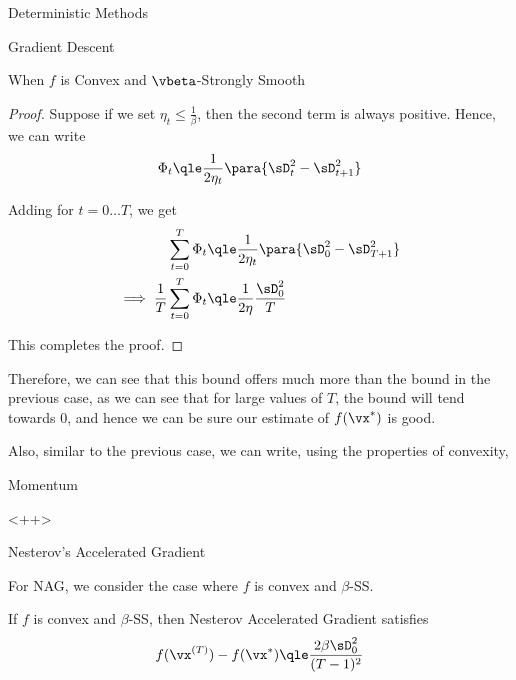 \documentclass{article}
\newcommand{\x}[1]{\vx^{(#1)}}
\newcommand{\f}[1]{f(\vx^{(#1)})}
\newcommand{\fs}{f(\vx^\ast)}
\begin{document}
\begin{psection}{Deterministic Methods}
\begin{psubsection}{Gradient Descent}
\begin{pssubsection}{When $f$ is Convex and $\vbeta$-Strongly Smooth}
\begin{theorem}
\begin{proof}
					Suppose if we set $\eta_t \le \frac{1}{\beta}$, then the second term is always positive. Hence, we can write
					\begin{align*}
						\Phi_t	\qle	\frac{1}{2 \eta_t} \para{\sD_t^2 - \sD_{t + 1}^2}
					\end{align*}

					Adding for $t = 0 \dots T$, we get
					\begin{align*}
						\sum_{t = 0}^T	\Phi_t						&\qle	\frac{1}{2 \eta_t} \para{\sD_0^2 - \sD_{T + 1}^2} \\
						\implies \frac{1}{T} \sum_{t = 0}^T	\Phi_t	&\qle	\frac{1}{2 \eta} \frac{\sD_0^2}{T}
					\end{align*}

					This completes the proof.
				\end{proof}
			\end{theorem}

			Therefore, we can see that this bound offers much more than the bound in the previous case, as we can see that for large values of $T$, the bound will tend towards 0, and hence we can be sure our estimate of $\fs$ is good.

			Also, similar to the previous case, we can write, using the properties of convexity,
			\answer{
				\begin{equation}
					\func{f}{\frac{1}{T} \sum_{t = 1}^T \x{t}}	\qle	\frac{1}{2 \eta} \cdot \frac{\sD_0^2}{T}
					\label{eq:gd-2-bound}
				\end{equation}
			}

		\end{pssubsection}

	\end{psubsection}

	\begin{psubsection}{Momentum}

		<++>

	\end{psubsection}

	\begin{psubsection}{Nesterov's Accelerated Gradient}

		For NAG, we consider the case where $f$ is convex and $\beta$-SS.

		\begin{theorem}
			\label{th:nag}
			If $f$ is convex and $\beta$-SS, then Nesterov Accelerated Gradient satisfies
			\begin{equation}
				\f{T} - \fs	\qle	\frac{2 \beta \sD_0^2}{(T - 1)^2}
				\label{eq:nag}
			\end{equation}


\end{theorem}
\end{psubsection}
\end{psection}
\end{document}

